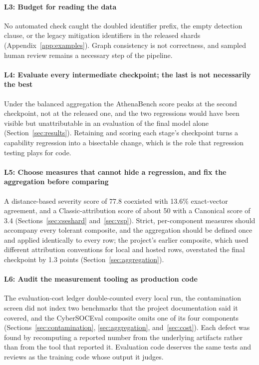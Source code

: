 \documentclass[twocolumn]{svjour3}
\begin{document}
\paragraph{L3: Budget for reading the data}
No automated check caught the doubled identifier prefix, the empty detection clause, or the legacy mitigation identifiers in the released shards (Appendix~\ref{app:examples}). Graph consistency is not correctness, and sampled human review remains a necessary step of the pipeline.

\paragraph{L4: Evaluate every intermediate checkpoint; the last is not necessarily the best}
Under the balanced aggregation the AthenaBench score peaks at the second checkpoint, not at the released one, and the two regressions would have been visible but unattributable in an evaluation of the final model alone (Section~\ref{sec:results}). Retaining and scoring each stage's checkpoint turns a capability regression into a bisectable change, which is the role that regression testing plays for code.

\paragraph{L5: Choose measures that cannot hide a regression, and fix the aggregation before comparing}
A distance-based severity score of 77.8 coexisted with 13.6\% exact-vector agreement, and a Classic-attribution score of about 50 with a Canonical score of 3.4 (Sections~\ref{sec:cseshard} and~\ref{sec:vsp}). Strict, per-component measures should accompany every tolerant composite, and the aggregation should be defined once and applied identically to every row; the project's earlier composite, which used different attribution conventions for local and hosted rows, overstated the final checkpoint by 1.3 points (Section~\ref{sec:aggregation}).

\paragraph{L6: Audit the measurement tooling as production code}
The evaluation-cost ledger double-counted every local run, the contamination screen did not index two benchmarks that the project documentation said it covered, and the CyberSOCEval composite omits one of its four components (Sections~\ref{sec:contamination}, \ref{sec:aggregation}, and~\ref{sec:cost}). Each defect was found by recomputing a reported number from the underlying artifacts rather than from the tool that reported it. Evaluation code deserves the same tests and reviews as the training code whose output it judges.
\end{document}
